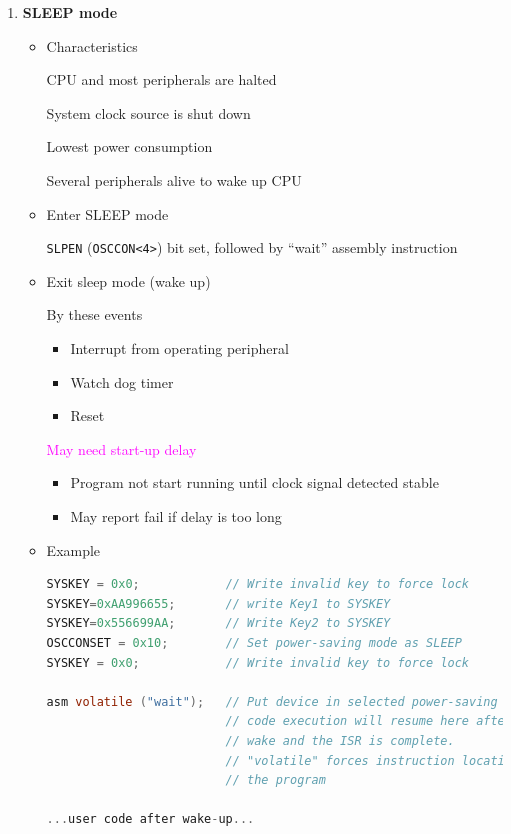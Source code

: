 \documentclass[a4paper]{article}
\begin{document}
\begin{enumerate}[label = \arabic*.]
    \item \textbf{SLEEP mode}
      \begin{itemize}[leftmargin = 1cm]
        \item Characteristics
          \par CPU and most peripherals are halted
          \par System clock source is shut down
          \par Lowest power consumption
          \par Several peripherals alive to wake up CPU
        \item Enter SLEEP mode
          \par \verb|SLPEN| (\verb|OSCCON<4>|) bit set, followed by “wait” assembly instruction
        \item Exit sleep mode (wake up)
          \par By these events
          \begin{itemize}[leftmargin = 1cm]
            \item Interrupt from operating peripheral
            \item Watch dog timer
            \item Reset
          \end{itemize}
          \par \textcolor{magenta}{May need start-up delay}
          \begin{itemize}[leftmargin = 1cm]
            \item Program not start running until clock signal detected stable
            \item May report fail if delay is too long
          \end{itemize}
        \item Example
          \begin{lstlisting}[language=c]
SYSKEY = 0x0;            // Write invalid key to force lock
SYSKEY=0xAA996655;       // write Key1 to SYSKEY
SYSKEY=0x556699AA;       // Write Key2 to SYSKEY
OSCCONSET = 0x10;        // Set power-saving mode as SLEEP
SYSKEY = 0x0;            // Write invalid key to force lock

asm volatile ("wait");   // Put device in selected power-saving mode
                         // code execution will resume here after
                         // wake and the ISR is complete.
                         // "volatile" forces instruction location in
                         // the program

...user code after wake-up...
        \end{lstlisting}
      \end{itemize}


\end{enumerate}
\end{document}
